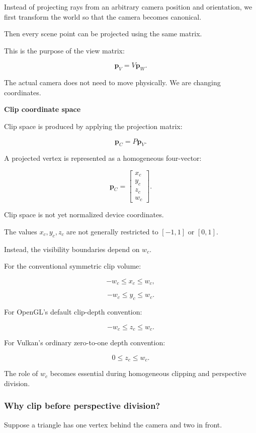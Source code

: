 Instead of projecting rays from an arbitrary camera position and orientation, we first transform the world so that the camera becomes canonical.

Then every scene point can be projected using the same matrix.

This is the purpose of the view matrix:

\[
 \boxed{ \mathbf p_V=V\mathbf p_W }.
\]

The actual camera does not need to move physically. We are changing coordinates.

\textbf{Clip coordinate space}

Clip space is produced by applying the projection matrix:

\[
 \boxed{ \mathbf p_C=P\mathbf p_V }.
\]

A projected vertex is represented as a homogeneous four-vector:

\[
 \mathbf p_C= \begin{bmatrix} x_c\\y_c\\z_c\\w_c \end{bmatrix}.
\]

Clip space is not yet normalized device coordinates.

The values \(x_c,y_c,z_c\) are not generally restricted to \([-1,1]\) or \([0,1]\).

Instead, the visibility boundaries depend on \(w_c\).

For the conventional symmetric clip volume:

\[
 -w_c\le x_c\le w_c,
\]

\[
 -w_c\le y_c\le w_c.
\]

For OpenGL's default clip-depth convention:

\[
 -w_c\le z_c\le w_c.
\]

For Vulkan's ordinary zero-to-one depth convention:

\[
 0\le z_c\le w_c.
\]

The role of \(w_c\) becomes essential during homogeneous clipping and perspective division.

\subsubsection{Why clip before perspective division?}\label{why-clip-before-perspective-division}

Suppose a triangle has one vertex behind the camera and two in front.

